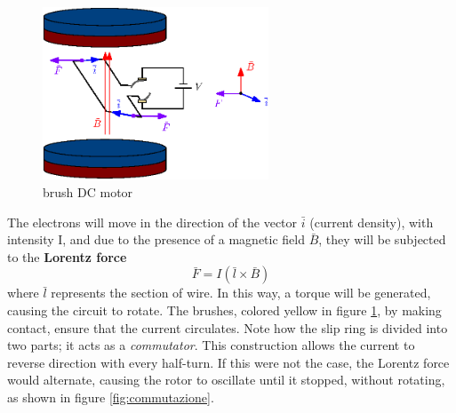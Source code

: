 \documentclass[10pt, letterpaper]{report}
\begin{document}
\begin{figure}[h!]
    \centering
    \includegraphics[width=0.6\textwidth ]{images/motore2.eps}
    \caption{brush DC motor}
    \label{fig:motor}
\end{figure}

The electrons will move in the direction of the vector  
$\bar i$
(current density), with intensity I, and due to the presence of a magnetic field  
$\bar B$, they will be subjected to the \textbf{Lorentz force}
\begin{equation}
     \bar F = I(\bar l \times \bar B)
\end{equation}
where $\bar l$ represents the section of wire.
In this way, a torque will be generated, causing the circuit to rotate. The brushes, colored yellow in figure \ref{fig:motor}, by making contact, ensure that the current circulates. Note how the slip ring is divided into two parts; it acts as a \textit{commutator}. This construction allows the current to reverse direction with every half-turn. If this were not the case, the Lorentz force would alternate, causing the rotor to oscillate until it stopped, without rotating, as shown in figure \ref{fig:commutazione}.\bigskip
\end{document}
